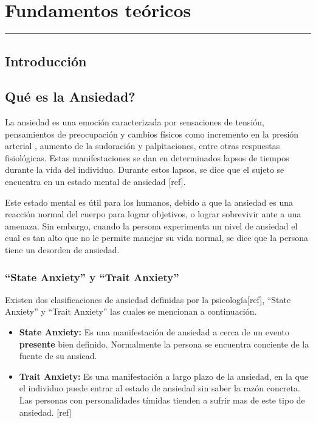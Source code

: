 \chapter{Fundamentos te\'oricos}\label{capit:cap2}
\vspace{-2.0325ex}%
\noindent
\rule{\textwidth}{0.5pt}
\vspace{-5.5ex}%
\newcommand{\pushline}{\Indp}%

\section{Introducci\'on}\label{secc:introduccion}





\section{Qu\'e es la Ansiedad?}\label{secc:ansiedad}

La ansiedad es una emoci\'on caracterizada por sensaciones de tensi\'on, pensamientos de preocupaci\'on y cambios f\'isicos como incremento en la presi\'on arterial \citep{psychologyapa}, aumento de la sudoraci\'on y palpitaciones, entre otras respuestas fisiol\'ogicas. Estas manifestaciones se dan en determinados lapsos de tiempos durante la vida del individuo. Durante estos lapsos, se dice que el sujeto se encuentra en un estado mental de ansiedad [ref].

Este estado mental es \'util para los humanos, debido a que la ansiedad es una reacci\'on normal del cuerpo para lograr objetivos, o lograr sobrevivir ante a una amenaza. Sin embargo, cuando la persona experimenta un nivel de ansiedad el cual es tan alto que no le permite manejar su vida normal, se dice que la persona tiene un desorden de ansiedad\citep{repetto2013}. 


\subsection{``State Anxiety'' y ``Trait Anxiety''}\label{secc:anxieystatevstrait}
Existen dos clasificaciones de ansiedad definidas por la psicolog\'ia[ref], ``State Anxiety'' y ``Trait Anxiety'' las cuales se mencionan a continuaci\'on.

\begin{itemize}
	\item{\textbf{State Anxiety:}} Es una manifestaci\'on de ansiedad a cerca de un evento \textbf{presente} bien definido. Normalmente la persona se encuentra conciente de la fuente de su ansiead. 
	\item{\textbf{Trait Anxiety:}} Es una manifestaci\'on a largo plazo de la ansiedad, en la que el individuo puede entrar al estado de ansiedad sin saber la raz\'on concreta. Las personas con personalidades t\'imidas tienden a sufrir mas de este tipo de ansiedad. [ref]

\end{itemize}

